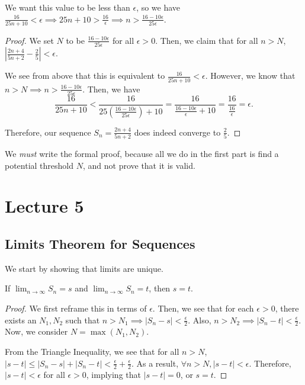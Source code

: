\documentclass{book}
\begin{document}
We want this value to be less than $\epsilon$, so we have $\frac{16}{25n + 10} < \epsilon \implies 25n + 10 > \frac{16}{\epsilon} \implies n > \frac{16 - 10 \epsilon}{25\epsilon}$.

\begin{proof}
    We set $N$ to be $\frac{16 - 10 \epsilon}{25 \epsilon}$ for all $\epsilon > 0$. Then, we claim that for all $n > N$, $|\frac{2n + 4}{5n + 2} - \frac{2}{5}| < \epsilon$.

    We see from above that this is equivalent to $\frac{16}{25n + 10} < \epsilon$. However, we know that $n > N \implies n > \frac{16 - 10 \epsilon}{25 \epsilon}$. Then, we have 
    \[ \frac{16}{25n + 10} < \frac{16}{25\left(\frac{16 - 10 \epsilon}{25 \epsilon} \right) + 10} = \frac{16}{\frac{16 - 10 \epsilon}{\epsilon} + 10} = \frac{16}{\frac{16}{\epsilon}} = \epsilon.\]

    Therefore, our sequence $S_n = \frac{2n + 4}{5n + 2}$ does indeed converge to $\frac{2}{5}$.
\end{proof}

We \textit{must} write the formal proof, because all we do in the first part is find a potential threshold $N$, and not prove that it is valid.

\newpage
\section{Lecture 5}
\subsection{Limits Theorem for Sequences}
We start by showing that limits are unique.
\begin{thm}
    If $\lim_{n \to \infty} S_n = s$ and $\lim_{n \to \infty} S_n = t$, then $s = t$.
\end{thm}

\begin{proof}
    We first reframe this in terms of $\epsilon$. Then, we see that for each $\epsilon > 0$, there exists an $N_1, N_2$ such that $n > N_1 \implies |S_n - s| < \frac{\epsilon}{2}$. Also, $n > N_2 \implies |S_n - t| < \frac{\epsilon}{2}$. Now, we consider $N = \max(N_1, N_2)$. 

    From the Triangle Inequality, we see that for all $n > N$, $|s - t| \leq |S_n - s| + |S_n - t| < \frac{\epsilon}{2} + \frac{\epsilon}{2}$. As a result, $\forall n > N, |s - t| < \epsilon$. Therefore, $|s - t| < \epsilon$ for all $\epsilon > 0$, implying that $|s - t| = 0$, or $s = t$.
\end{proof}
\end{document}
